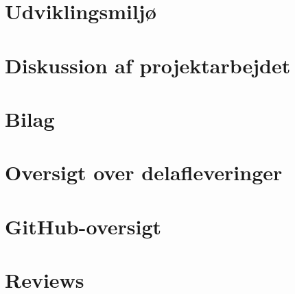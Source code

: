\documentclass[12pt, a4paper]{article}
\begin{document}
\section{Udviklingsmiljø}

\section{Diskussion af projektarbejdet}



\section*{Bilag}

\section{Oversigt over delafleveringer}
\label{bilag:delafleveringer}

\section{GitHub-oversigt}
\label{bilag:github}

\section{Reviews}
\label{bilag:reviews}
\end{document}
